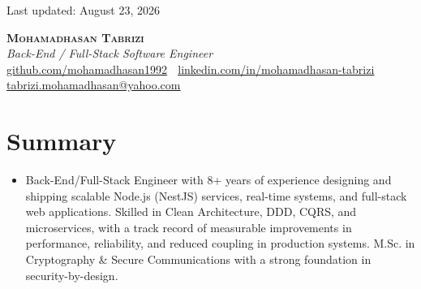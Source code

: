 \documentclass[letterpaper,11pt]{article}
\newcommand{\resumeItem}[1]{
  \item\small{
    {#1 \vspace{-2pt}}
  }
}
\newcommand{\resumeSubHeadingListStart}{\begin{itemize}[leftmargin=0.15in, label={}]}
\newcommand{\resumeSubHeadingListEnd}{\end{itemize}}
\begin{document}
\begin{flushright}
  \color{gray}
  \small Last updated: August 23, 2026
\end{flushright}

\vspace{-15pt}

\begin{center}
    \textbf{\Huge \scshape Mohamadhasan Tabrizi} \\ \vspace{6pt}
    \small \textit{Back-End / Full-Stack Software Engineer} \\ \vspace{6pt}
    \href{https://github.com/mohamadhasan1992}{\underline{github.com/mohamadhasan1992}} $ \; $
    \href{https://www.linkedin.com/in/mohamadhasan-tabrizi/}{\underline{linkedin.com/in/mohamadhasan-tabrizi}} $ \; $
    \href{mailto:tabrizi.mohamadhasan@yahoo.com}
    {\underline{tabrizi.mohamadhasan@yahoo.com}}
\end{center}

\section{Summary}
\resumeSubHeadingListStart
  \resumeItem{Back-End/Full-Stack Engineer with 8+ years of experience designing and shipping scalable Node.js (NestJS) services, real-time systems, and full-stack web applications. Skilled in Clean Architecture, DDD, CQRS, and microservices, with a track record of measurable improvements in performance, reliability, and reduced coupling in production systems. M.Sc. in Cryptography \& Secure Communications with a strong foundation in security-by-design.}
\resumeSubHeadingListEnd

\end{document}
